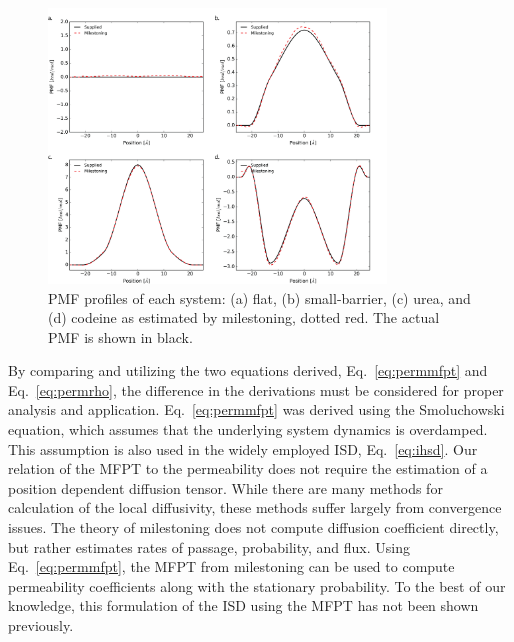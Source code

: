     \begin{figure}[!htbp]
    \begin{center}
        \includegraphics[width=0.8\textwidth]{Figures/calcpmf}
        \caption[PMF profiles of each system (a) flat, (b) small-barrier, (c) urea, and (d) codeine]{PMF profiles of each system: (a) flat, (b) small-barrier, (c) urea, and (d) codeine as estimated by milestoning, dotted red. The actual PMF is shown in black.}
        \label{fig:calcpmf}
    \end{center}
    \end{figure}

	\par By comparing and utilizing the two equations derived, Eq.~\ref{eq:permmfpt} and Eq.~\ref{eq:permrho}, the difference in the derivations must be considered for proper analysis and application. Eq.~\ref{eq:permmfpt} was derived using the Smoluchowski equation, which assumes that the underlying system dynamics is overdamped. This assumption is also used in the widely employed ISD, Eq.~\ref{eq:ihsd}. Our relation of the MFPT to the permeability does not require the estimation of a position dependent diffusion tensor. While there are many methods for calculation of the local diffusivity, these methods suffer largely from convergence issues\cite{Mamonov2006,Lee2016}. The theory of milestoning does not compute diffusion coefficient directly, but rather estimates rates of passage, probability, and flux. Using Eq.~\ref{eq:permmfpt}, the MFPT from milestoning can be used to compute permeability coefficients along with the stationary probability. To the best of our knowledge, this formulation of the ISD using the MFPT has not been shown previously.

